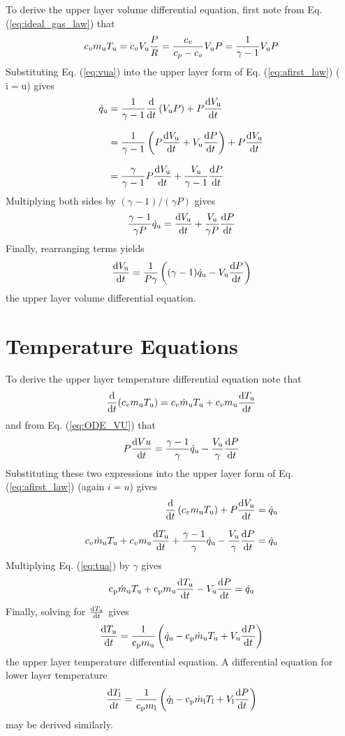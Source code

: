 \documentclass[12pt,twoside]{book}
\begin{document}
To derive the upper layer volume differential equation, first note from Eq. (\ref{eq:ideal_gas_law}) that
\begin{equation}
c_v \mmu\Tu= c_v \Vu \frac{P}{R} = \frac{c_v}{c_p-c_v}\Vu P=\frac{1}{\gamma-1}\Vu P
\label{eq:vua}
\end{equation}
Substituting Eq. (\ref{eq:vua}) into the upper layer form of Eq. (\ref{eq:afirst_law}) (${\mathrm{i}}={\mathrm{u}}$) gives
\begin{align}
\dqu&=\frac{1}{\gamma-1}\ddt\left(\Vu P\right) + P\dbydt{\Vu}\\[.1in]
&=\frac{1}{\gamma-1}\left(P\dbydt{\Vu} + \Vu\dbydt{P}\right) + P\dbydt{\Vu}\\[.1in]
&=\frac{\gamma}{\gamma-1}P\dbydt{\Vu} + \frac{\Vu}{\gamma-1}\dbydt{P}
\end{align}
Multiplying both sides by $(\gamma-1)/(\gamma P)$ gives
\begin{equation}
\frac{\gamma-1}{\gamma P}\dqu=\dbydt{\Vu} + \frac{\Vu}{\gamma P}\dbydt{P}\label{eq:vub}
\end{equation}
Finally, rearranging terms yields
\begin{equation}
\dbydt{\Vu} = \frac{1}{P\gamma}\left((\gamma-1)\dqu - \Vu\dbydt{P}\right)
\label{eq:ODE_VU}
\end{equation}
the upper layer volume differential equation.


\section{Temperature Equations}

To derive the upper layer temperature differential equation note that
\begin{equation}
\ddt(c_v \mmu\Tu)=c_v \dmu\Tu+ c_v \mmu\dbydt{\Tu}
\end{equation}
and from Eq. (\ref{eq:ODE_VU}) that
\begin{equation}
P\dbydt{Vu} = \frac{\gamma-1}{\gamma} \dqu - \frac{\Vu}{\gamma}\dbydt{P}
\label{eq:pvu}
\end{equation}
Substituting these two expressions into the upper layer form of Eq. (\ref{eq:afirst_law}) (again $i=u$) gives
\begin{align}
   \ddt\left(c_v \mmu \Tu\right) +  P \dbydt{\Vu} &=\dqu\\[.1in]
c_v \dmu\Tu+c_v \mmu\dbydt{\Tu}+\frac{\gamma-1}{\gamma} \dqu - \frac{\Vu}{\gamma}\dbydt{P}&=\dqu
\label{eq:tua}
\end{align}
Multiplying Eq. (\ref{eq:tua}) by $\gamma$ gives
\begin{equation}
\cp\dmu\Tu+\cp \mmu\dbydt{\Tu} - \Vu\dbydt{P}=\dqu
\end{equation}
Finally, solving for $\dbydt{\Tu}$ gives
\begin{equation}
\dbydt{\Tu}=\frac{1}{\cp \mmu}\left( \dqu-\cp\dmu\Tu+ \Vu\dbydt{P}\right)
\label{eq:ODE_TU}
\end{equation}
the upper layer temperature differential equation.  A differential equation for lower layer temperature
\begin{equation}
\dbydt{\Tl}=\frac{1}{\cp\ml}\left( \dql-\cp\dml\Tl+ \Vl\dbydt{P}\right)
\label{eq:ODE_TL}
\end{equation}
 may be derived similarly.
\end{document}
